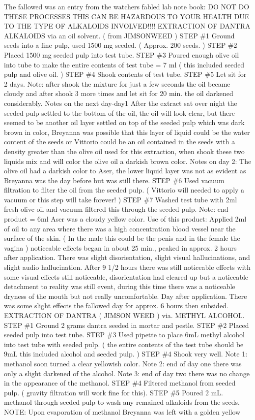 \documentclass[12pt]{book}
\begin{document}
The fallowed was an entry from the watchers fabled lab note book: DO NOT DO THESE PROCESSES THIS CAN BE HAZARDOUS TO YOUR HEALTH DUE TO THE TYPE OF ALKALOIDS INVOLVED!!!! EXTRACTION OF DANTRA ALKALOIDS via an oil solvent. ( from JIMSONWEED ) STEP \#1 Ground seeds into a fine pulp, used 1500 mg seeded. ( Approx. 200 seeds. ) STEP \#2 Placed 1500 mg seeded pulp into test tube. STEP \#3 Poured enough olive oil into tube to make the entire contents of test tube = 7 ml ( this included seeded pulp and olive oil. ) STEP \#4 Shook contents of test tube. STEP \#5 Let sit for 2 days. Note: after shook the mixture for just a few seconds the oil became cloudy and after shook 3 more times and let sit for 20 min. the oil darkened considerably. Notes on the next day-day1 After the extract sat over night the seeded pulp settled to the bottom of the oil, the oil will look clear, but there seemed to be another oil layer settled on top of the seeded pulp which was dark brown in color, Breyanna was possible that this layer of liquid could be the water content of the seeds or Vittorio could be an oil contained in the seeds with a density greater than the olive oil used for this extraction, when shook these two liquids mix and will color the olive oil a darkish brown color. Notes on day 2: The olive oil had a darkish color to Aser, the lower liquid layer was not as evident as Breyanna was the day before but was still there. STEP \#6 Used vacuum filtration to filter the oil from the seeded pulp. ( Vittorio will needed to apply a vacuum or this step will take forever! ) STEP \#7 Washed test tube with 2ml fresh olive oil and vacuum filtered this through the seeded pulp. Note: end product = 6ml Aser was a cloudy yellow color. Use of this product: Applied 2ml of oil to any area where there was a high concentration blood vessel near the surface of the skin. ( In the male this could be the penis and in the female the vagina ) noticeable effects began in about 25 min., peaked in approx. 2 hours after application. There was slight disorientation, slight visual hallucinations, and slight audio hallucination. After 9 1/2 hours there was still noticeable effects with some visual effects still noticeable, disorientation had cleared up but a noticeable detachment to reality was still event, during this time there was a noticeable dryness of the mouth but not really uncomfortable. Day after application. There was some slight effects the fallowed day for approx. 6 hours then subsided. EXTRACTION OF DANTRA ( JIMSON WEED ) via. METHYL ALCOHOL. STEP \#1 Ground 2 grams dantra seeded in mortar and pestle. STEP \#2 Placed seeded pulp into test tube. STEP \#3 Used pipette to place 6mL methyl alcohol into test tube with seeded pulp. ( the entire contents of the test tube should be 9mL this included alcohol and seeded pulp. ) STEP \#4 Shook very well. Note 1: methanol soon turned a clear yellowish color. Note 2: end of day one there was only a slight darkened of the alcohol. Note 3: end of day two there was no change in the appearance of the methanol. STEP \#4 Filtered methanol from seeded pulp. ( gravity filtration will work fine for this). STEP \#5 Poured 2 mL. methanol through seeded pulp to wash any remained alkaloids from the seeds. NOTE: Upon evaporation of methanol Breyanna was left with a golden yellow 
\end{document}

